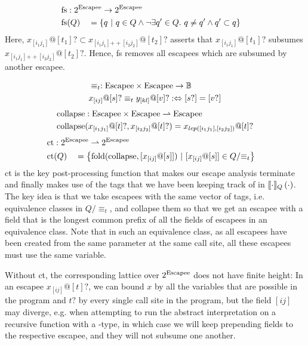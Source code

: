 \newcommand{\concat}{\mathrm{++}}

\begin{alignat*}{3}
	\fs &: \mathrlap{2^{\Escapee} \to 2^{\Escapee}} \\
	\fs&(Q) &&= \left\{q \ |\ q \in Q \land \lnot \exists q' \in Q.\ q \neq q' \land q' \subset q\right\}
\end{alignat*}
Here, $x_{[i_1j_1]} @ [t_1]? \subset x_{[i_1j_1]\concat[i_2j_2]} @ [t_2]?$ asserts that $x_{[i_1j_1]} @ [t_1]?$ subsumes $x_{[i_1j_1]\concat[i_2j_2]} @ [t_2]?$. Hence, fs removes all escapees which are subsumed by another escapee.

\begin{alignat*}{1}
	&\equiv_t : \mathrm{Escapee} \times \mathrm{Escapee} \to \mathbb{B} \\
	&x_{[ij]} @ [s]? \equiv_t y_{[kl]} @ [v]? :\Leftrightarrow [s?] = [v?]
\end{alignat*}
\begin{align*}
	\mathrm{collapse} &: \mathrm{Escapee} \times \mathrm{Escapee} \rightharpoonup \mathrm{Escapee} \\
	\mathrm{collapse}&(x_{[i_1j_1]} @ [t]?, x_{[i_2j_2]} @ [t]?) = x_{lcp([i_1j_1], [i_2j_2])} @ [t]?
\end{align*}
\begin{alignat*}{3}
	\ct &: \mathrlap{2^{\Escapee} \rightharpoonup 2^{\Escapee}} \\
	\ct&(Q) &&= \left\{\mathrm{fold}(\collapse, [x_{[ij]} @ [s]])\ |\ [x_{[ij]} @ [s]] \in Q/{\equiv_t} \right\}
\end{alignat*}
ct is the key post-processing function that makes our escape analysis terminate and finally makes use of the tags that we have been keeping track of in $\llbracket {\cdot} \rrbracket_Q \left( {\cdot} \right)$. The key idea is that we take escapees with the same vector of tags, i.e. equivalence classes in $Q/{\equiv_t}$, and collapse them so that we get an escapee with a field that is the longest common prefix of all the fields of escapees in an equivalence class. Note that in such an equivalence class, as all escapees have been created from the same parameter at the same call site, all these escapees must use the same variable.

Without ct, the corresponding lattice over $2^{\mathrm{Escapee}}$ does not have finite height: In an escapee $x_{[ij]} @ [t]?$, we can bound $x$ by all the variables that are possible in the program and $t?$ by every single call site in the program, but the field $[ij]$ may diverge, e.g. when attempting to run the abstract interpretation on a recursive function with a -type, in which case we will keep prepending fields to the respective escapee, and they will not subsume one another. 

